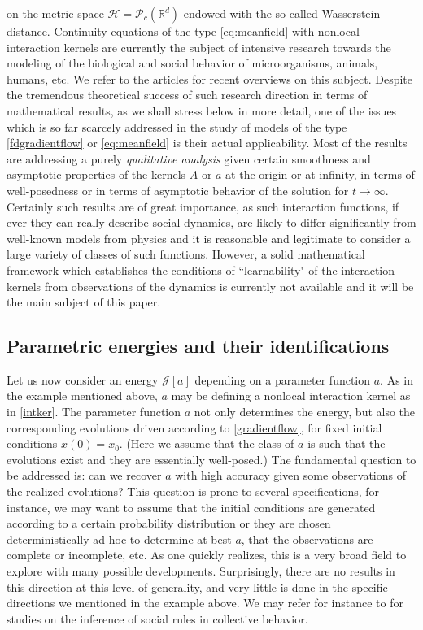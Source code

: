 on the metric space $\mathcal H =\mathcal P_c(\mathbb R^d)$ endowed with the so-called Wasserstein distance. Continuity equations of the type \eqref{eq:meanfield} with nonlocal interaction kernels are currently the subject of intensive research  towards the modeling of the biological and social behavior of microorganisms, animals, humans, etc. We refer to the  articles \cite{cafotove10,13-Carrillo-Choi-Hauray-MFL} for recent overviews on this subject. Despite the tremendous theoretical success of such research direction in terms of mathematical results, as we shall stress below in more detail, one of the issues which is so far scarcely addressed in the study of models of the type \eqref{fdgradientflow} or \eqref{eq:meanfield} is their actual applicability. Most of the results are addressing a purely {\it qualitative analysis} given certain smoothness and asymptotic properties of the kernels $A$ or $a$ at the origin or at infinity, in terms of well-posedness or in terms of asymptotic behavior of the solution for $t \to \infty$.  Certainly such results are of great importance, as such interaction functions, if ever they can really describe social dynamics,  are likely to differ significantly from well-known models from physics and it is reasonable and legitimate to consider a large variety of classes of such functions.
However, a solid mathematical framework which establishes the conditions of ``learnability" of the interaction kernels from observations of the dynamics is currently not available and it will be the main subject of this paper.

\subsection{Parametric energies and their identifications}

Let us now consider an energy $\mathcal J[a]$ depending on a parameter function $a$. As in the example mentioned above, $a$ may be defining a nonlocal interaction kernel as in  \eqref{intker}. The parameter function $a$ not only determines the energy, but also the corresponding evolutions driven according to \eqref{gradientflow}, for fixed initial conditions $x(0)=x_0$. (Here we assume that the class of $a$ is such that the evolutions exist and they are essentially well-posed.)
The fundamental question to be addressed is: can we recover $a$ with high accuracy given some observations of the realized evolutions? This question is prone to several specifications, for instance, we may want to assume that the initial conditions are generated according to a certain probability distribution or they are chosen deterministically ad hoc to determine at best $a$, that the observations are complete or incomplete, etc. As one  quickly realizes, this is a very broad field to explore with many possible developments. Surprisingly, there are no results in this direction at this level of generality, and very little is done in the specific directions we mentioned in the example above. We may refer for instance to \cite{mann11,heoemascszwa11} for studies on the inference of social rules in collective behavior. 
